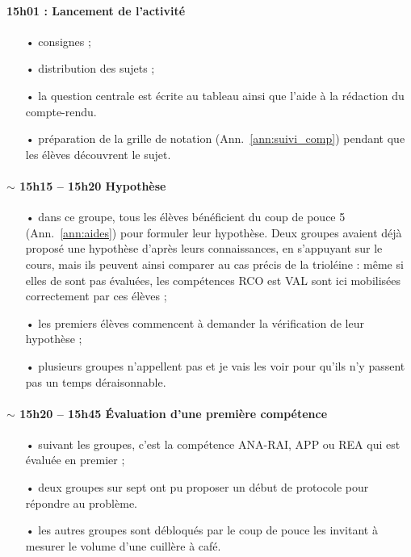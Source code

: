 \documentclass[12pt,a4paper, fleqn]{report}
\newcommand{\app}{\colorbox{bleu_c}{\textcolor{bleu_f}{APP}}}
\newcommand{\rea}{\colorbox{yellow_c}{\textcolor{yellow_f}{REA}}}
\newcommand{\anarai}{\colorbox{green_c}{\textcolor{green_f}{ANA-RAI}}}
\newcommand{\val}{\colorbox{orange_c}{\textcolor{orange_f}{VAL}}}
\newcommand{\rco}{\colorbox{gray_c}{\textcolor{gray_f}{RCO}}}
\begin{document}
\paragraph{15h01 : Lancement de l'activité}
\begin{itemize}
\item[•] consignes ;
\item[•] distribution des sujets ;
\item[•] la question centrale est écrite au tableau ainsi que l'aide à la rédaction du compte-rendu.
\item[•] préparation de la grille de notation (Ann.~\ref{ann:suivi_comp}) pendant que les élèves découvrent le sujet.
\end{itemize}

\paragraph{$\sim$ 15h15 -- 15h20 Hypothèse}
\begin{itemize}
\item[•] dans ce groupe, tous les élèves bénéficient du coup de pouce 5 (Ann.~\ref{ann:aides}) pour formuler leur hypothèse.
Deux groupes avaient déjà proposé une hypothèse d'après leurs connaissances, en s'appuyant sur le cours, mais ils peuvent ainsi comparer au cas précis de la trioléine : même si elles de sont pas évaluées, les compétences \rco{} est \val{} sont ici mobilisées correctement par ces élèves ;
\item[•] les premiers élèves commencent à demander la vérification de leur hypothèse ;
\item[•] plusieurs groupes n'appellent pas et je vais les voir pour qu'ils n'y passent pas un temps déraisonnable.
\end{itemize}

\paragraph{$\sim$ 15h20 -- 15h45 Évaluation d'une première compétence}
\begin{itemize}
\item[•] suivant les groupes, c'est la compétence \anarai{}, \app{} ou \rea{} qui est évaluée en premier ;
\item[•] deux groupes sur sept ont pu proposer un début de protocole pour répondre au problème.
\item[•] les autres groupes sont débloqués par le coup de pouce les invitant à mesurer le volume d'une cuillère à café.
\end{itemize}
\end{document}
